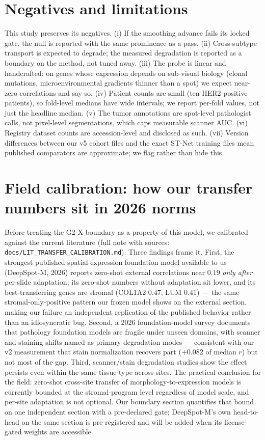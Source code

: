 \documentclass[11pt]{article}
\begin{document}
\section{Negatives and limitations}
This study preserves its negatives. (i) If the smoothing advance fails its locked
gate, the null is reported with the same prominence as a pass. (ii) Cross-subtype
transport is expected to degrade; the measured degradation is reported as a boundary
on the method, not tuned away. (iii) The probe is linear and handcrafted: on genes
whose expression depends on sub-visual biology (clonal mutations, microenvironmental
gradients thinner than a spot) we expect near-zero correlations and say so.
(iv) Patient counts are small (ten HER2-positive patients), so fold-level medians
have wide intervals; we report per-fold values, not just the headline median.
(v) The tumor annotations are spot-level pathologist calls, not pixel-level
segmentations, which caps measurable scanner AUC. (vi) Registry dataset counts are
accession-level and disclosed as such. (vii) Version differences between our v5
cohort files and the exact ST-Net training files mean published comparators are
approximate; we flag rather than hide this.

\section{Field calibration: how our transfer numbers sit in 2026 norms}
Before treating the G2-X boundary as a property of this model, we calibrated
against the current literature (full note with sources:
\texttt{docs/LIT\_TRANSFER\_CALIBRATION.md}). Three findings frame it.
First, the strongest published spatial-expression foundation model available to
us (DeepSpot-M, 2026) reports zero-shot external correlations near $0.19$
\emph{only after} per-slide adaptation; its zero-shot numbers without
adaptation sit lower, and its best-transferring genes are stromal (COL1A2
$0.47$, LUM $0.41$) --- the same stromal-only-positive pattern our frozen model
shows on the external section, making our failure an independent replication
of the published behavior rather than an idiosyncratic bug. Second, a 2026
foundation-model survey documents that pathology foundation models are fragile
under unseen domains, with scanner and staining shifts named as primary
degradation modes --- consistent with our v2 measurement that stain
normalization recovers part ($+0.082$ of median $r$) but not most of the gap.
Third, scanner/stain degradation studies show the effect persists even within
the same tissue type across sites. The practical conclusion for the field:
zero-shot cross-site transfer of morphology-to-expression models is currently
bounded at the stromal-program level regardless of model scale, and per-site
adaptation is not optional. Our boundary section quantifies that bound on one
independent section with a pre-declared gate; DeepSpot-M's own head-to-head on
the same section is pre-registered and will be added when its license-gated
weights are accessible.
\end{document}
